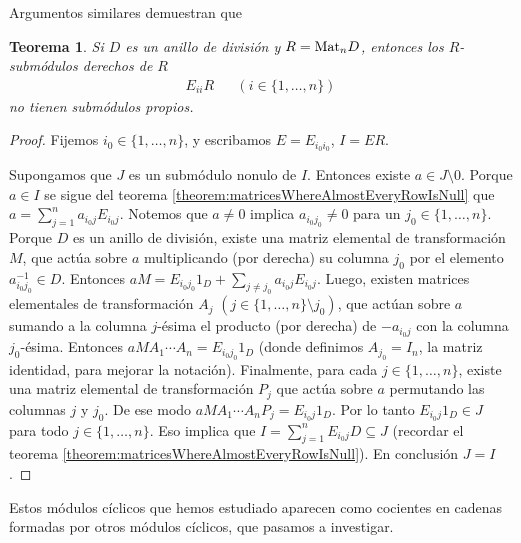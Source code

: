 \documentclass{report}
\newcommand{\Mat}{\textnormal{Mat}}
\newtheorem{theorem}{Teorema}
\begin{document}
  Argumentos similares demuestran que
  \begin{theorem}
    Si \(D\) es un anillo de división y \(R = \Mat_n D\), entonces los \(R\)-submódulos derechos de \(R\)
    \begin{align}
      E_{i i} R
      &&(i \in \{1, \dots, n\})
    \end{align}
    no tienen submódulos propios.
  \end{theorem}
  \begin{proof}
    Fijemos \(i_0 \in \{1, \dots, n\}\), y escribamos \(E = E_{i_0 i_0}\), \(I = E R\).

    Supongamos que \(J\) es un submódulo nonulo de \(I\).
    Entonces existe \(a \in J \setminus 0\).
    Porque \(a \in I\) se sigue del teorema \ref{theorem:matricesWhereAlmostEveryRowIsNull} que \(a = \sum_{j = 1}^n a_{i_0 j} E_{i_0 j}\).
    Notemos que \(a \neq 0\) implica \(a_{i_0 j_0} \neq 0\) para un \(j_0 \in \{1, \dots, n\}\).
    Porque \(D\) es un anillo de división, existe una matriz elemental de transformación \(M\), que actúa sobre \(a\) multiplicando (por derecha) su columna \(j_0\) por el elemento \(a_{i_0 j_0}^{- 1} \in D\).
    Entonces \(a M = E_{i_0 j_0} 1_D + \sum_{j \neq j_0} a_{i_0 j} E_{i_0 j}\).
    Luego, existen matrices elementales de transformación \(A_j\) \((j \in \{1, \dots, n\} \setminus j_0)\), que actúan sobre \(a\) sumando a la columna \(j\)-ésima el producto (por derecha) de \(- a_{i_0 j}\) con la columna \(j_0\)-ésima.
    Entonces \(a M A_1 \cdots A_n = E_{i_0 j_0} 1_D\) (donde definimos \(A_{j_0} = I_n\), la matriz identidad, para mejorar la notación).
    Finalmente, para cada \(j \in \{1, \dots, n\}\), existe una matriz elemental de transformación \(P_j\) que actúa sobre \(a\) permutando las columnas \(j\) y \(j_0\).
    De ese modo \(a M A_1 \cdots A_n P_j = E_{i_0 j} 1_D\).
    Por lo tanto \(E_{i_0 j} 1_D \in J\) para todo \(j \in \{1, \dots, n\}\).
    Eso implica que \(I = \sum_{j = 1}^n E_{i_0 j} D \subseteq J\) (recordar el teorema \ref{theorem:matricesWhereAlmostEveryRowIsNull}).
    En conclusión \(J = I\).
  \end{proof}

  Estos módulos cíclicos que hemos estudiado aparecen como cocientes en cadenas formadas por otros módulos cíclicos, que pasamos a investigar.
\end{document}
